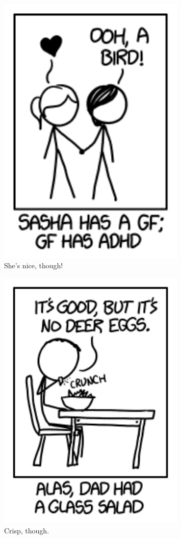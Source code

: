 {\begin{figure}[!htbp]
\centering
\includegraphics[scale=0.5, max width=0.8\textwidth]{imgs/a/75/t9_sasha.png}
\caption{She's nice, though!}
\end{figure}

\begin{figure}[!htbp]
\centering
\includegraphics[scale=0.5, max width=0.8\textwidth]{imgs/a/75/t9_salad.png}
\caption{Crisp, though.}
\end{figure}

}
